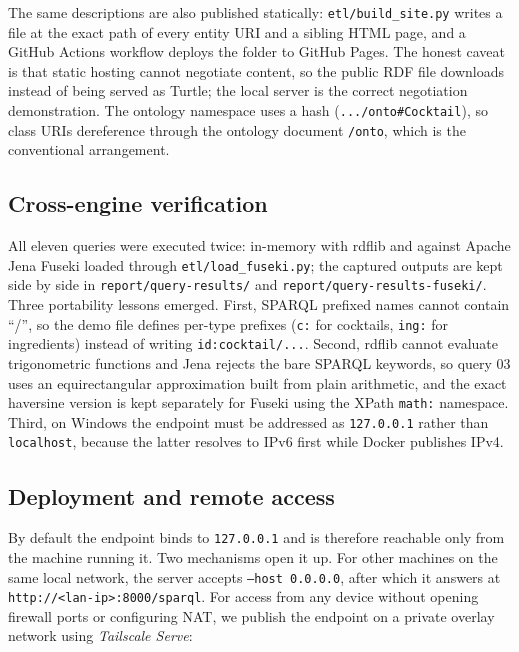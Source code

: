 The same descriptions are also published statically: \texttt{etl/build\_site.py}
writes a file at the exact path of every entity URI and a sibling HTML page,
and a GitHub Actions workflow deploys the folder to GitHub Pages. The honest
caveat is that static hosting cannot negotiate content, so the public RDF file
downloads instead of being served as Turtle; the local server is the correct
negotiation demonstration. The ontology namespace uses a hash
(\texttt{.../onto\#Cocktail}), so class URIs dereference through the ontology
document \texttt{/onto}, which is the conventional arrangement.

\subsection{Cross-engine verification}

All eleven queries were executed twice: in-memory with rdflib and against
Apache Jena Fuseki loaded through \texttt{etl/load\_fuseki.py}; the captured
outputs are kept side by side in \texttt{report/query-results/} and
\texttt{report/query-results-fuseki/}. Three portability lessons emerged. First,
SPARQL prefixed names cannot contain ``/'', so the demo file defines per-type
prefixes (\texttt{c:} for cocktails, \texttt{ing:} for ingredients) instead of
writing \texttt{id:cocktail/...}. Second, rdflib cannot evaluate trigonometric
functions and Jena rejects the bare SPARQL keywords, so query 03 uses an
equirectangular approximation built from plain arithmetic, and the exact
haversine version is kept separately for Fuseki using the XPath
\texttt{math:} namespace. Third, on Windows the endpoint must be addressed as
\texttt{127.0.0.1} rather than \texttt{localhost}, because the latter resolves
to IPv6 first while Docker publishes IPv4.

\subsection{Deployment and remote access}

By default the endpoint binds to \texttt{127.0.0.1} and is therefore reachable
only from the machine running it. Two mechanisms open it up. For other machines
on the same local network, the server accepts \texttt{--host 0.0.0.0}, after
which it answers at \texttt{http://<lan-ip>:8000/sparql}. For access from any
device without opening firewall ports or configuring NAT, we publish the
endpoint on a private overlay network using \emph{Tailscale Serve}:

